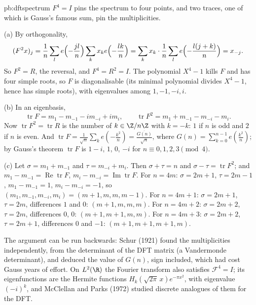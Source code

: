 \begin{solution}{pb:dftspectrum}
\idea $F^4=I$ pins the spectrum to four points, and two traces, one of which is Gauss's famous sum, pin the multiplicities.

\writeup (a) By orthogonality,
\[
(F^2x)_j=\frac1n\sum_le\Bigl(-\frac{jl}n\Bigr)\sum_kx_ke\Bigl(-\frac{lk}n\Bigr)=\sum_kx_k\cdot\frac1n\sum_le\Bigl(-\frac{l(j+k)}n\Bigr)=x_{-j}.
\]
So $F^2=R$, the reversal, and $F^4=R^2=I$. The polynomial $X^4-1$ kills $F$ and has four simple roots, so $F$ is diagonalisable (its
minimal polynomial divides $X^4-1$, hence has simple roots), with eigenvalues among $1,-1,-i,i$.

(b) In an eigenbasis,
\[
\operatorname{tr}F=m_1-m_{-1}-im_{-i}+im_i,\qquad\operatorname{tr}F^2=m_1+m_{-1}-m_{-i}-m_i.
\]
Now $\operatorname{tr}F^2=\operatorname{tr}R$ is the number of $k\in\Z/n\Z$ with $k=-k$: $1$ if $n$ is odd and $2$ if $n$ is even. And
$\operatorname{tr}F=\frac1{\sqrt n}\sum_ke(-\frac{k^2}n)=\frac{\overline{G(n)}}{\sqrt n}$, where $G(n)=\sum_{k=0}^{n-1}e(\frac{k^2}n)$; by Gauss's theorem $\operatorname{tr}F$ is $1-i$, $1$, $0$, $-i$ for
$n\equiv0,1,2,3\pmod4$.

(c) Let $\sigma=m_1+m_{-1}$ and $\tau=m_{-i}+m_i$. Then $\sigma+\tau=n$ and $\sigma-\tau=\operatorname{tr}F^2$; and $m_1-m_{-1}=\operatorname{Re}\operatorname{tr}F$, $m_i-m_{-i}=\operatorname{Im}\operatorname{tr}F$. For
$n=4m$: $\sigma=2m+1$, $\tau=2m-1$, $m_1-m_{-1}=1$, $m_i-m_{-i}=-1$, so $(m_1,m_{-1},m_{-i},m_i)=(m+1,m,m,m-1)$. For $n=4m+1$: $\sigma=2m+1$, $\tau=2m$,
differences $1$ and $0$: $(m+1,m,m,m)$. For $n=4m+2$: $\sigma=2m+2$, $\tau=2m$, differences $0$, $0$: $(m+1,m+1,m,m)$. For $n=4m+3$: $\sigma=2m+2$,
$\tau=2m+1$, differences $0$ and $-1$: $(m+1,m+1,m+1,m)$.

\leads The argument can be run backwards: Schur (1921) found the multiplicities independently, from the determinant of the DFT
matrix (a Vandermonde determinant), and deduced the value of $G(n)$, sign included, which had cost Gauss years of effort. On $L^2(\R)$ the
Fourier transform also satisfies $\mathcal F^4=I$; its eigenfunctions are the Hermite functions $H_k(\sqrt{2\pi}\,x)e^{-\pi x^2}$, with eigenvalue $(-i)^k$, and
McClellan and Parks (1972) studied discrete analogues of them for the DFT.
\end{solution}

